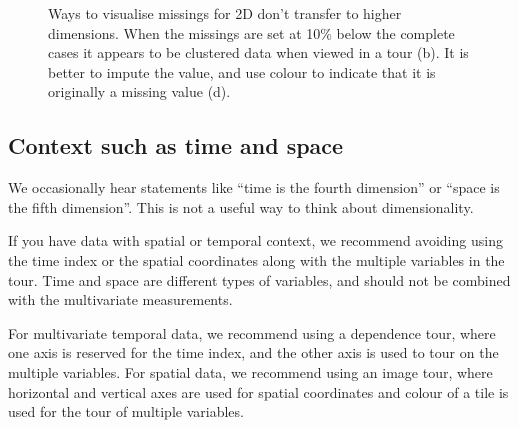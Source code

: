 \documentclass[
  letterpaper,
]{krantz}
\begin{document}
\begin{figure}
\begin{minipage}{0.50\linewidth}
{}


\end{minipage}%
%
\begin{minipage}{0.50\linewidth}



\end{minipage}%

\caption{\label{fig-missings-pdf}Ways to visualise missings for 2D don't
transfer to higher dimensions. When the missings are set at 10\% below
the complete cases it appears to be clustered data when viewed in a tour
(b). It is better to impute the value, and use colour to indicate that
it is originally a missing value (d). }

\end{figure}%

\subsection{Context such as time and
space}\label{context-such-as-time-and-space}

We occasionally hear statements like ``time is the fourth dimension'' or
``space is the fifth dimension''. This is not a useful way to think
about dimensionality.

If you have data with spatial or temporal context, we recommend avoiding
using the time index or the spatial coordinates along with the multiple
variables in the tour. Time and space are different types of variables,
and should not be combined with the multivariate measurements.

For multivariate temporal data, we recommend using a dependence tour,
where one axis is reserved for the time index, and the other axis is
used to tour on the multiple variables. For spatial data, we recommend
using an image tour, where horizontal and vertical axes are used for
spatial coordinates and colour of a tile is used for the tour of
multiple variables.
\end{document}
